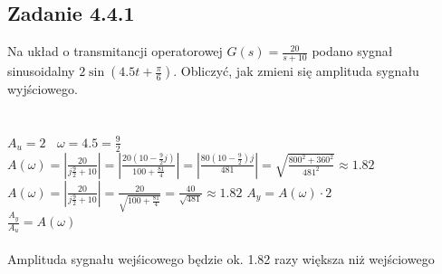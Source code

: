 \pagebreak
\subsection*{Zadanie 4.4.1} {\color{darkgray}
	Na układ o transmitancji operatorowej $G(s)=\frac{20}{s+10}$ podano sygnał sinusoidalny $2\sin(4.5t+\frac \pi 6)$. Obliczyć, jak zmieni się amplituda sygnału wyjściowego.\\
}\lineh
\\\\
$A_u=2 \ \ \ \ \omega = 4.5=\frac 9 2$\\
$A(\omega)=|\frac{20}{j \frac 9 2 + 10}|=|\frac{20(10-\frac 9 2 j)}{100+\frac{81}{4}}|=|\frac{80(10-\frac 9 2)j}{481}|=\sqrt{\frac{800^2+360^2}{481^2}}\approx 1.82$\\
 {\color{lightgray}$A(\omega)=|\frac{20}{j\frac 9 2 +10}|=\frac{20}{\sqrt{100+\frac{81}{4}}}= \frac{40}{\sqrt{481}} \approx 1.82$}
$A_y=A(\omega)\cdot 2$\\
$\frac{A_y}{A_u}=A(\omega)$\\
\\
Amplituda sygnału wejśicowego będzie ok. 1.82 razy większa niż wejściowego\\



\pagebreak
